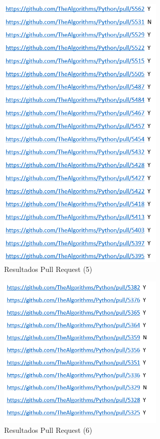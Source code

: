 \documentclass[a4paper, 12pt]{book}
\begin{document}
\begin{figure}
	\centering
    \includegraphics[width=0.7\textwidth]{img/git9}
    \caption{Resultados Pull Request (5)}
 \end{figure}
 
\begin{figure}
	\centering
    \includegraphics[width=0.7\textwidth]{img/git10}
    \caption{Resultados Pull Request (6)}
 \end{figure}
 
\end{document}
